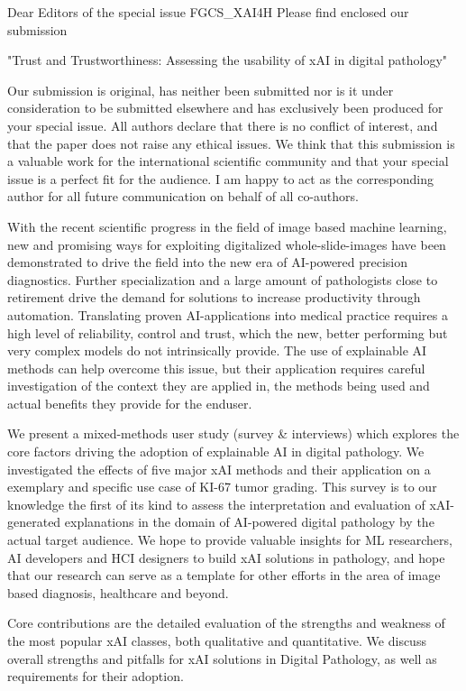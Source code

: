 Dear Editors of the special issue FGCS\_XAI4H
Please find enclosed our submission

"Trust and Trustworthiness: Assessing the usability of xAI in digital pathology"

Our submission is original, has neither been submitted nor is it under consideration to be submitted elsewhere and has exclusively been produced for your special issue. All authors declare that there is no conflict of interest, and that the paper does not raise any ethical issues. We think that this submission is a valuable work for the international scientific community and that your special issue is a perfect fit for the audience. I am happy to act as the corresponding author for all future communication on behalf of all co-authors.

With the recent scientific progress in the field of image based machine learning, new and promising ways for exploiting digitalized whole-slide-images have been demonstrated to drive the field into the new era of AI-powered precision diagnostics. Further specialization and a large amount of pathologists close to retirement drive the demand for solutions to increase productivity through automation. Translating proven AI-applications into medical practice requires a high level of reliability, control and trust, which the new, better performing but very complex models do not intrinsically provide. The use of explainable AI methods can help overcome this issue, but their application requires careful investigation of the context they are applied in, the methods being used and actual benefits they provide for the enduser.


We present a mixed-methods user study (survey & interviews) which explores the core factors driving the adoption of explainable AI in digital pathology. We investigated the effects of five major xAI methods and their application on a exemplary and specific use case of KI-67 tumor grading. This survey is to our knowledge the first of its kind to assess the interpretation and evaluation of xAI-generated explanations in the domain of AI-powered digital pathology by the actual target audience. We hope to provide valuable insights for ML researchers, AI developers and HCI designers to build xAI solutions in pathology, and hope that our research can serve as a template for other efforts in the area of image based diagnosis, healthcare and beyond. 

Core contributions are the detailed evaluation of the strengths and weakness of the most popular xAI classes, both qualitative and quantitative. We discuss overall strengths and pitfalls for xAI solutions in Digital Pathology, as well as requirements for their adoption.


